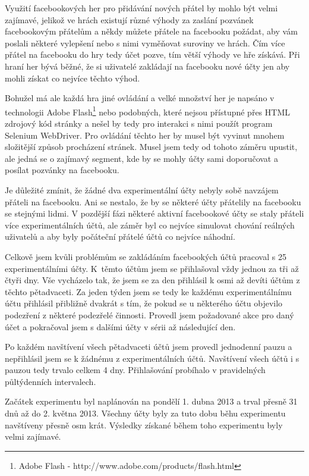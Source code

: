 \documentclass[thesis=M,czech]{FITthesis}[2013/05/10]
\begin{document}
Využití facebookových her pro přidávání nových přátel by mohlo být velmi zajímavé, jelikož ve hrách existují různé výhody za zaslání pozvánek facebookovým přátelům a někdy můžete přátele na facebooku požádat, aby vám poslali některé vylepšení nebo s nimi vyměňovat suroviny ve hrách. Čím více přátel na facebooku do hry tedy účet pozve, tím větší výhody ve hře získává. Při hraní her bývá běžné, že si uživatelé zakládají na facebooku nové účty jen aby mohli získat co nejvíce těchto výhod.

Bohužel má ale každá hra jiné ovládání a velké množství her je napsáno v technologii Adobe Flash\footnote{Adobe Flash - http://www.adobe.com/products/flash.html} nebo podobných, které nejsou přístupné přes HTML zdrojový kód stránky a nešel by tedy pro interakci s nimi použít program Selenium WebDriver. Pro ovládání těchto her by musel být vyvinut mnohem složitější způsob procházení stránek. Musel jsem tedy od tohoto záměru upustit, ale jedná se o zajímavý segment, kde by se mohly účty sami doporučovat a posílat pozvánky na facebooku.

Je důležité zmínit, že žádné dva experimentální účty nebyly sobě navzájem přáteli na facebooku. Ani se nestalo, že by se některé účty přátelily na facebooku se stejnými lidmi. V pozdější fázi některé aktivní facebookové účty se staly přáteli více experimentálních účtů, ale záměr byl co nejvíce simulovat chování reálných uživatelů a aby byly počáteční přátelé účtů co nejvíce náhodní.

Celkově jsem kvůli problémům se zakládáním facebookých účtů pracoval s 25 experimentálními účty. K~těmto účtům jsem se přihlašoval vždy jednou za tři až čtyři dny. Vše vycházelo tak, že jsem se za den přihlásil k osmi až devíti účtům z těchto pětadvaceti. Za jeden týden jsem se tedy ke každému experimentálnímu účtu přihlásil přibližně dvakrát s tím, že pokud se u některého účtu objevilo podezření z některé podezřelé činnosti. Provedl jsem požadované akce pro daný účet a pokračoval jsem s dalšími účty v sérii až následující den.

Po každém navštívení všech pětadvaceti účtů jsem provedl jednodenní pauzu a nepřihlásil jsem se k žádnému z experimentálních účtů. Navštívení všech účtů i s pauzou tedy trvalo celkem 4 dny. Přihlašování probíhalo v pravidelných půltýdenních intervalech.

Začátek experimentu byl naplánován na pondělí 1. dubna 2013 a trval přesně 31 dnů až do 2. května 2013. Všechny účty byly za tuto dobu běhu experimentu navštíveny přesně osm krát. Výsledky získané během toho experimentu byly velmi zajímavé.
\end{document}
